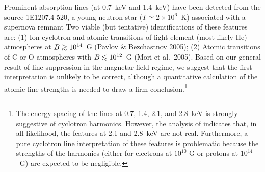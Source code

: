\documentclass[useAMS,onecolumn,usenatbib,usegraphicx]{mn2e}
\def\go{\mathrel{\raise.3ex\hbox{$>$}\mkern-14mu\lower0.6ex\hbox{$\sim$}}}
\def\lo{\mathrel{\raise.3ex\hbox{$<$}\mkern-14mu\lower0.6ex\hbox{$\sim$}}}
\begin{document}
Prominent absorption lines (at $0.7$~keV and 1.4~keV) have been
detected from the source 1E1207.4-520, a young neutron star 
($T\simeq 2\times 10^6$~K) associated with 
a supernova remnant 
%
%
\citep[][]{Sanwaletal02a,Bignamietal03a,DeLucaetal04a,Morietal05a}
Two viable (but tentative) identifications of these 
features are: (1) Ion cyclotron and atomic transitions of light-element 
(most likely He) atmospheres at $B\go 10^{14}$~G (Pavlov \& Bezchastnov
2005); (2) Atomic transitions of C or O atmospheres with $B\lo 10^{12}$~G
(Mori et al.~2005). Based on our general result of line suppression in
the magnetar field regime, we suggest that the first interpretation is 
unlikely to be correct, although a quantitative calculation of the 
%
%
atomic line strengths is needed to draw a firm conclusion.\footnote{The energy 
spacing of the lines at 0.7, 1.4, 2.1, and 2.8~keV is strongly suggestive 
of cyclotron harmonics.
However, the analysis 
of \citet[][]{Morietal05a} indicates that, in all likelihood, the features at 
2.1 and 2.8~keV are not real.  Furthermore, a pure cyclotron line interpretation 
of these features is problematic because the strengths of the harmonics (either 
for electrons at $10^{10}$ G or protons at $10^{14}$~G) are expected to be 
negligible.}
\end{document}
